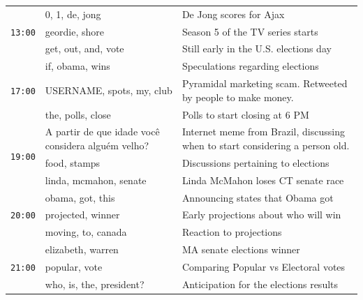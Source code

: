 \documentclass[letterpaper,12pt,titlepage,oneside,final]{book}
\begin{document}
\begin{table}

\begin{center}
\small
\def\arraystretch{1.1}
\begin{tabular}{|p{.6cm}|p{2.5cm}|p{5cm}|}

\hline
\multirow{3}{*}{\texttt{13:00}} 	&  0, 1, de, jong 			& De Jong scores for Ajax \\ \cline{2-3} %
					   	& geordie, shore		& Season 5 of the TV series starts \\ \cline{2-3}
						& get, out, and, vote		& Still early in the U.S. elections day \\\hline

\multirow{3}{*}{\texttt{17:00}} 	&  if, obama, wins		& Speculations regarding elections \\ \cline{2-3}
					   	& USERNAME, spots, my, club		&  Pyramidal marketing scam. Retweeted by people to make money.  \\ \cline{2-3}
						& the, polls, close		& Polls to start closing at 6 PM \\\hline %

\multirow{3}{*}{\texttt{19:00}} 	&  A partir de que idade voc\^{e} considera algu\'{e}m velho?		& Internet meme from Brazil, discussing when to start considering a person old. \\ \cline{2-3}
					   	& food, stamps		& Discussions pertaining to elections \\ \cline{2-3}
						& linda, mcmahon, senate		&  Linda McMahon loses CT senate race \\\hline

\multirow{3}{*}{\texttt{20:00}} 	& obama, got, this		&  Announcing states that Obama got \\ \cline{2-3}
					   	& projected, winner		& Early projections about who will win \\ \cline{2-3}
						& moving, to, canada		&  Reaction to projections \\\hline


\multirow{3}{*}{\texttt{21:00}} 	& elizabeth, warren		&  MA senate elections winner \\ \cline{2-3}
					   	& popular, vote		& Comparing Popular vs Electoral votes \\ \cline{2-3}
						& who, is, the, president?		&  Anticipation for the elections results\\\hline
						


\end{tabular}
\end{center}
\end{table}
\end{document}
